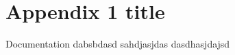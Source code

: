 \chapter{Appendix 1 title}
\label{appendiceA}
\thispagestyle{empty}

\noindent 
Documentation dabsbdasd sahdjasjdas dasdhasjdajsd